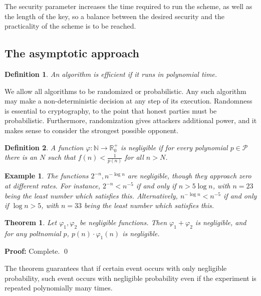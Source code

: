 \documentclass[a4paper, 12pt]{article}
\newtheorem{example}{Example}
\newtheorem{theorem}{Theorem}
\newtheorem{example}{Example} \newtheorem{definition}{Definition}
\newtheorem{theorem}{Theorem}
\newenvironment{proof}[1][Proof]{\par\small\noindent\textbf{#1:} }{\qed\par\normalsize}
\begin{document}
The security parameter increases the time required to run the scheme,
as well as the length of the key, so a balance between the desired 
security and the practicality of the scheme is to be reached.

\subsection{The asymptotic approach}

\begin{definition}
    An algorithm is efficient if it runs in polynomial time.
\end{definition}

We allow all algorithms to be randomized or probabilistic. Any 
such algorithm may make a non-deterministic decision at any step 
of its execution. Randomness is essential to cryptography, to the 
point that honest parties must be probabilistic. Furthermore, 
randomization gives attackers additional power, and it makes sense 
to consider the strongest possible opponent. 

\begin{definition}
    A function $\varphi : \mathbb{N} \to \mathbb{R}^+_0$ is negligible if for 
    every polynomial $p \in \mathcal{P}$ there is an 
    $N$ such that $f(n) < \frac{1}{p(n)}$ for all
    $n > N$.
\end{definition}

\begin{example}
    The functions $2^{-n}, n^{- \log n}$ are negligible,
    though they approach zero at different rates. For instance, 
    $2^{-n} < n^{-5}$ if and only if $n > 5 \log n$, with $n = 23$
    being the least number which satisfies this. Alternatively, 
    $n^{-\log n} < n^{-5}$ if and only if $\log n > 5$, with 
    $n = 33$ being the least number which satisfies this.
\end{example}

\begin{theorem}
    Let $\varphi_1, \varphi_2$ be negligible functions. Then 
    $\varphi_1 + \varphi_2$ is negligible, and 
    for any poltnomial $p$, 
    $p(n) \cdot \varphi_1(n)$ is negligible.
\end{theorem}

\begin{proof}
    Complete.
\end{proof}

The theorem guarantees that if certain event occurs with only 
negligible probability, such event occurs with negligible 
probability even if the experiment is repeated polynomially 
many times.
\end{document}
